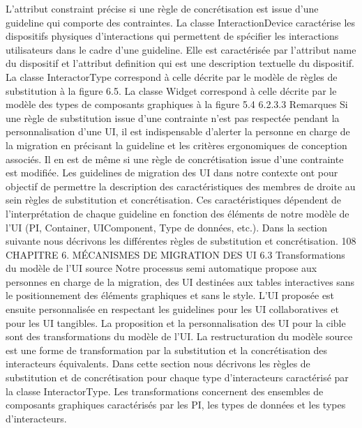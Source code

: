 \documentclass{article}
\begin{document}
L’attribut constraint pr\'{e}cise si une r\`{e}gle de concr\'{e}tisation est issue d’une guideline qui comporte
des contraintes.
La classe InteractionDevice
caract\'{e}rise les dispositifs physiques d’interactions qui permettent de
sp\'{e}ciﬁer les interactions utilisateurs dans le cadre d’une guideline. Elle est caract\'{e}ris\'{e}e par l’attribut
name du dispositif et l’attribut deﬁnition qui est une description textuelle du dispositif.
La classe InteractorType
correspond \`{a} celle d\'{e}crite par le mod\`{e}le de r\`{e}gles de substitution \`{a} la
ﬁgure 6.5.
La classe Widget
correspond \`{a} celle d\'{e}crite par le mod\`{e}le des types de composants graphiques \`{a} la
ﬁgure 5.4
6.2.3.3
Remarques
Si une r\`{e}gle de substitution issue d’une contrainte n’est pas respect\'{e}e pendant la personnalisation
d’une UI, il est indispensable d’alerter la personne en charge de la migration en pr\'{e}cisant la guideline
et les crit\`{e}res ergonomiques de conception associ\'{e}s.
Il en est de m\^{e}me si une r\`{e}gle de concr\'{e}tisation issue d’une contrainte est modiﬁ\'{e}e.
Les guidelines de migration des UI dans notre contexte ont pour objectif de permettre la description des caract\'{e}ristiques des membres de droite au sein r\`{e}gles de substitution et concr\'{e}tisation. Ces
caract\'{e}ristiques d\'{e}pendent de l’interpr\'{e}tation de chaque guideline en fonction des \'{e}l\'{e}ments de notre
mod\`{e}le de l’UI (PI, Container, UIComponent, Type de donn\'{e}es, etc.).
Dans la section suivante nous d\'{e}crivons les diff\'{e}rentes r\`{e}gles de substitution et concr\'{e}tisation.
108
CHAPITRE 6. MÉCANISMES DE MIGRATION DES UI
6.3
Transformations du mod\`{e}le de l’UI source
Notre processus semi automatique propose aux personnes en charge de la migration, des UI destin\'{e}es aux tables interactives sans le positionnement des \'{e}l\'{e}ments graphiques et sans le style. L’UI
propos\'{e}e est ensuite personnalis\'{e}e en respectant les guidelines pour les UI collaboratives et pour les
UI tangibles. La proposition et la personnalisation des UI pour la cible sont des transformations du
mod\`{e}le de l’UI. La restructuration du mod\`{e}le source est une forme de transformation par la substitution et la concr\'{e}tisation des interacteurs \'{e}quivalents.
Dans cette section nous d\'{e}crivons les r\`{e}gles de substitution et de concr\'{e}tisation pour chaque type
d’interacteurs caract\'{e}ris\'{e} par la classe InteractorType. Les transformations concernent des ensembles
de composants graphiques caract\'{e}ris\'{e}s par les PI, les types de donn\'{e}es et les types d’interacteurs.
\end{document}
